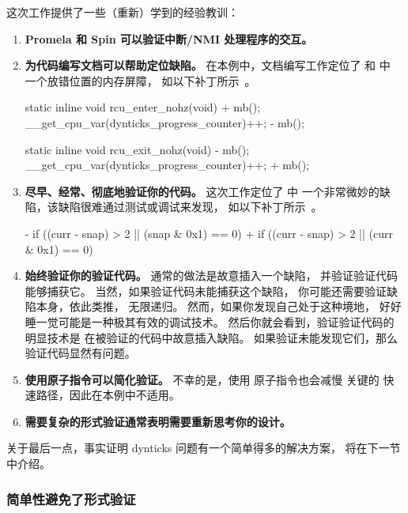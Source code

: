这次工作提供了一些（重新）学到的经验教训：

\begin{enumerate}
\item	{\bf Promela 和 Spin 可以验证中断/NMI 处理程序的交互。}
\item	{\bf 为代码编写文档可以帮助定位缺陷。}
	在本例中，文档编写工作定位了
	 和  中
	一个放错位置的内存屏障，
	如以下补丁所示~\cite{PaulEMcKenney2008commit:ae66be9b71b1}。

\begin{VerbatimU}
 static inline void rcu_enter_nohz(void)
 {
+       mb();
        __get_cpu_var(dynticks_progress_counter)++;
-       mb();
 }

 static inline void rcu_exit_nohz(void)
 {
-       mb();
        __get_cpu_var(dynticks_progress_counter)++;
+       mb();
 }
\end{VerbatimU}

\item	{\bf 尽早、经常、彻底地验证你的代码。}
	这次工作定位了  中
	一个非常微妙的缺陷，该缺陷很难通过测试或调试来发现，
	如以下补丁所示~\cite{PaulEMcKenney2008commit:d7c0651390b6}。

\begin{VerbatimU}
-       if ((curr - snap) > 2 || (snap & 0x1) == 0)
+       if ((curr - snap) > 2 || (curr & 0x1) == 0)
\end{VerbatimU}

\item	{\bf 始终验证你的验证代码。}
	通常的做法是故意插入一个缺陷，
	并验证验证代码能够捕获它。
	当然，如果验证代码未能捕获这个缺陷，
	你可能还需要验证缺陷本身，依此类推，
	无限递归。
	然而，如果你发现自己处于这种境地，
	好好睡一觉可能是一种极其有效的调试技术。
	然后你就会看到，验证验证代码的明显技术是
	在被验证的代码中故意插入缺陷。
	如果验证未能发现它们，那么验证代码显然有问题。
\item	{\bf 使用原子指令可以简化验证。}
	不幸的是，使用  原子指令也会减慢
	关键的  快速路径，因此在本例中不适用。
\item	{\bf 需要复杂的形式验证通常表明需要重新思考你的设计。}
\end{enumerate}

关于最后一点，事实证明 dynticks 问题有一个简单得多的解决方案，
将在下一节中介绍。

\subsubsection{简单性避免了形式验证}
\label{sec:formal:Simplicity Avoids Formal Verification}

